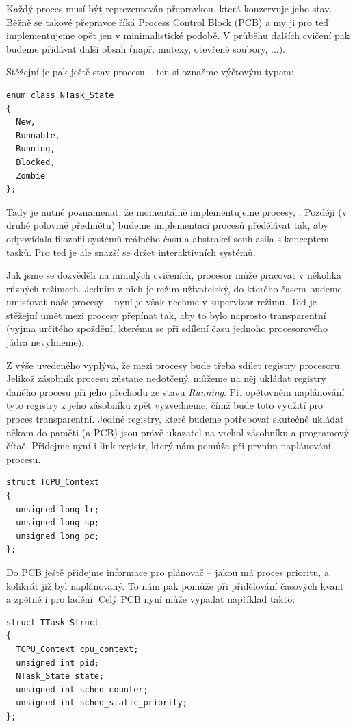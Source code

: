 \documentclass{article}
\begin{document}
Každý proces musí být reprezentován přepravkou, která konzervuje jeho stav. Běžně se takové přepravce říká Process Control Block (PCB) a my ji pro teď implementujeme opět jen v minimalistické podobě. V průběhu dalších cvičení pak budeme přidávat další obsah (např. mutexy, otevřené soubory, ...).

Stěžejní je pak ještě stav procesu -- ten si označme výčtovým typem:
\begin{lstlisting}
enum class NTask_State
{
  New,
  Runnable,
  Running,
  Blocked,
  Zombie
};
\end{lstlisting}
Tady je nutné poznamenat, že momentálně implementujeme procesy, . Později (v druhé polovině předmětu) budeme implementaci procesů předělávat tak, aby odpovídala filozofii systémů reálného času a abstrakcí souhlasila s konceptem tasků. Pro teď je ale snazší se držet interaktivních systémů.

Jak jsme se dozvěděli na minulých cvičeních, procesor může pracovat v několika různých režimech. Jedním z nich je režim uživatelský, do kterého časem budeme umisťovat naše procesy -- nyní je však nechme v supervizor režimu. Teď je stěžejní umět mezi procesy přepínat tak, aby to bylo naprosto transparentní (vyjma určitého zpoždění, kterému se při sdílení času jednoho procesorového jádra nevyhneme).

Z výše uvedeného vyplývá, že mezi procesy bude třeba sdílet registry procesoru. Jelikož zásobník procesu zůstane nedotčený, můžeme na něj ukládat registry daného procesu při jeho přechodu ze stavu \emph{Running}. Při opětovném naplánování tyto registry z jeho zásobníku zpět vyzvedneme, čímž bude toto využití pro proces transparentní. Jediné registry, které budeme potřebovat skutečně ukládat někam do paměti (a PCB) jsou právě ukazatel na vrchol zásobníku a programový čítač. Přidejme nyní i link registr, který nám pomůže při prvním naplánování procesu.
\begin{lstlisting}
struct TCPU_Context
{
  unsigned long lr;
  unsigned long sp;
  unsigned long pc;
};
\end{lstlisting}
Do PCB ještě přidejme informace pro plánovač -- jakou má proces prioritu, a kolikrát již byl naplánovaný. To nám pak pomůže při přidělování časových kvant a zpětně i pro ladění. Celý PCB nyní může vypadat například takto:
\begin{lstlisting}
struct TTask_Struct
{
  TCPU_Context cpu_context;
  unsigned int pid;
  NTask_State state;
  unsigned int sched_counter;
  unsigned int sched_static_priority;
};
\end{lstlisting}
\end{document}
